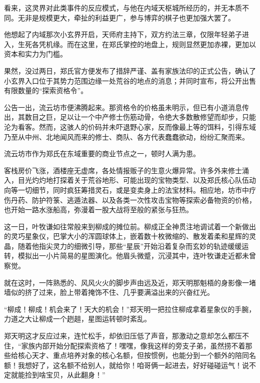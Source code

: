 看来，这灵界对此类事件的反应模式，与他在内域天枢城所经历的，并无本质不同。无非是规模更大，牵扯的利益更广，参与博弈的棋子也更加强大罢了。

他想起了内域那次小玄界开启，天师府主持下，双方约法三章，仅限年轻弟子进入，生死各凭机缘。而在这里，在郑氏掌控的地盘上，规则显然更加赤裸，更加以资本和实力为门槛。

\vspace{2em}

果然，没过两日，郑氏官方便发布了措辞严谨、盖有家族法印的正式公告，确认了小玄界入口位于其势力范围边缘一处荒谷的地点的消息；并同时宣布，将公开出售有限数量的“探索资格令”。

公告一出，流云坊市便沸腾起来。那资格令的价格虽未明示，但已有小道消息传出，其数目之巨，足以让一个中产修士伤筋动骨，令绝大多数散修望而却步，只能沦为看客。然而，这骇人的价码并未吓退野心家，反而像最上等的饵料，引得东域乃至从中州、北地闻风而来的修士、商队、各方代表蠢蠢欲动，纷纷汇聚而来。

流云坊市作为郑氏在东域重要的商业节点之一，顿时人满为患。

客栈房价飞涨，酒楼座无虚席，各处情报贩子的生意火爆异常。许多外来修士涌入，目光灼灼地打探着关于荒谷地形、可能出现的宝物类型、以及郑氏核心队伍动向等一切细节，同时疯狂筹措灵石，或是变卖身上的法宝材料。相应地，坊市中疗伤丹药、防护符箓、逃遁法器、以及各类一次性攻击宝物等探索必备物资的价格，也开始一路水涨船高，弥漫着一股大战将至般的紧张与狂热。

\vspace{2em}

这一日，叶牧谦如往常般来到柳成的摊位前。柳成正全神贯注地调试着一个新做出的灵巧星象仪，巴掌大小的浑圆球体上，嵌着数十枚微缩的、散发着柔和星辉的灵晶，随着他指尖灵力的细微引导，那些“星辰”开始沿着复杂而玄妙的轨迹缓缓运转，模拟出一小片简易的星图演化。他眉头微蹙，沉浸其中，连叶牧谦走近都未曾察觉。

就在这时，一阵熟悉的、风风火火的脚步声由远及近，郑天明那魁梧的身影像一堵墙似的挤了过来，脸上带着掩饰不住、几乎要满溢出来的兴奋红光。

“柳成！柳成！机会来了！天大的机会！”郑天明一把拉住柳成拿着星象仪的手腕，力道之大让柳成一个趔趄，星图运转顿时紊乱。

郑天明这才反应过来，连忙松手，却依旧压低了声音，那激动之意却怎么都压不住，“家族内部开始分配探索资格了！嘿嘿，像我这样的旁支子弟，虽然捞不着那些给核心天才、重点培养对象的核心名额，但按惯例，也能分到一个额外的陪同名额！我想好了，这名额不给别人，就给你！咱哥俩一起进去，好好碰碰运气！说不定就能捡到啥宝贝，从此翻身！”

